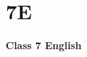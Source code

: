 \label{4 C7 English}
    \section{7E}
    \begin{frame}
    \begin{center}
    \begin{Huge}
        \textbf{Class 7 English}
    \end{Huge}
    \end{center}
    \end{frame}
 
    